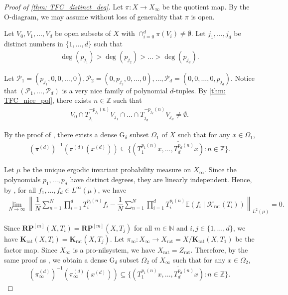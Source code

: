 \documentclass[11pt,reqno]{amsart}
\newcommand{\Z}{\mathbb{Z}}
\newcommand{\N}{\mathbb{N}}
\newcommand{\RP}{\mathbf{RP}}
\newcommand{\Krat}{\mathbf{K}_{\operatorname{rat}}}
\newcommand{\cP}{{\mathcal P}}
\theoremstyle{definition}
\theoremstyle{remark}
\begin{document}
\begin{proof}[Proof of \cref{thm: TFC_distinct_deg}]
     Let $\pi:X\to X_{\infty}$ be the quotient map. By the O-diagram, we may assume without loss of generality that $\pi$ is open.
     
     Let $V_{0},V_{1},\dots,V_{d}$ be open subsets of $X$ with $\cap_{i=0}^{d}\pi(V_i)\neq \emptyset$. Let $j_{1},\dots,j_{d}$ be distinct numbers in $\{1,\dots,d\}$ such that \begin{align*}
        \deg(p_{j_1})> \deg(p_{j_2}) > \dots >\deg(p_{j_{d}}).
    \end{align*}

    Let $\cP_{1} = (p_{j_1},0,0,\dots,0),\cP_{2} = (0,p_{j_2},0,\dots,0),\dots,\cP_{d} =(0,0,\dots,0,p_{j_d})$.  Notice that $(\cP_1,\dots,\cP_d)$ is a very nice family of polynomial $d$-tuples. By \cref{thm: TFC_nice_pol}, there exists $n\in \Z$ such that \begin{align*}
        V_{0} \cap T_{j_1}^{-p_{j_1}(n)} V_{j_1} \cap \dots\cap T_{j_d}^{-p_{j_d}(n)}V_{j_d} \neq \emptyset.
    \end{align*}

    By the proof of {\cite[Lemma 3.2]{Ye_Yu_polynomial_saturation:2025}}, there exists a dense G$_\delta$ subset $\Omega_1$ of $X$ such that for any $x\in \Omega_1$,\begin{align*}
        (\pi^{(d)})^{-1}(\pi^{(d)}(x^{(d)}))\subseteq \overline{\{ (T_1^{p_1(n)}x,\dots,T_{d}^{p_d(n)}x):n\in\Z\}}.
    \end{align*}

    Let $\mu$ be the unique ergodic invariant probability measure on $X_{\infty}$. Since the polynomials $p_1,\dots,p_d$ have distinct degrees, they are linearly independent. Hence, by {\cite[Theorem 2.10]{Frantzikinakis_Kuca_joint_erg_comm_poly:2025}}, for all $f_1,\dots,f_d\in L^{\infty}(\mu)$, we have\begin{align*}
        \lim_{N\to \infty}\left\|\dfrac{1}{N}\sum_{n=1}^{N} \prod_{i=1}^{d} T_{i}^{p_{i}(n)}f_i - \dfrac{1}{N}\sum_{n=1}^{N} \prod_{i=1}^{d} T_{i}^{p_{i}(n)}\mathbb{E}(f_i\mid \mathcal{K}_{\operatorname{rat}}(T_i)) \right\|_{L^2(\mu)}=0.
    \end{align*}

    Since $\RP^{[m]}(X,T_i)=\RP^{[m]}(X,T_j)$ for all $m\in\N$ and $i,j\in\{1,\dots,d\}$, we have $\Krat(X,T_i)=\Krat(X,T_j)$. Let $\pi_{\infty}: X_{\infty} \to X_{\operatorname{rat}} = X/\Krat(X,T_1)$ be the factor map. Since $X_{\infty}$ is a pro-nilsystem, we have $X_{\operatorname{rat}}=Z_{\operatorname{rat}}$. Therefore, by the same proof as {\cite[Theorem 3.7]{Ye_Yu_polynomial_saturation:2025}}, we obtain a dense G$_\delta$ subset $\Omega_2$ of $X_\infty$ such that for any $x\in \Omega_2$,\begin{align*}
        (\pi_{\infty}^{(d)})^{-1}(\pi_{\infty}^{(d)}(x^{(d)}))\subseteq \overline{\{ (T_1^{p_1(n)}x,\dots,T_{d}^{p_d(n)}x):n\in\Z\}}.
    \end{align*}


\end{proof}
\end{document}
